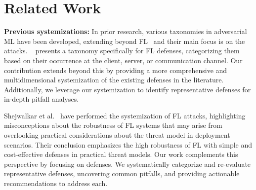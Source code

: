 \section{Related Work}\label{sec:related}
\noindent\textbf{Previous systemizations: }
In prior research, various taxonomies
in adversarial ML have been developed, extending beyond
FL~\cite{goldblum2020dataset, jere2020taxonomy, barreno2010the, biggio2018wild, huang2011adversarial, rodriguez2023survey} and their main focus is on the attacks.
~\cite{rodriguez2023survey}  presents a taxonomy specifically for FL defenses, categorizing them based on their occurrence at the client, server, or communication channel. Our contribution extends beyond this by providing a more comprehensive and multidimensional systemization of the existing defenses in the literature. Additionally, we leverage our systemization to identify representative defenses for in-depth pitfall analyses.


Shejwalkar et al.~\cite{shejwalkar2022back} have performed the systemization of FL attacks, highlighting misconceptions about the robustness of FL systems that may arise from overlooking practical considerations about the threat model in deployment scenarios. Their conclusion emphasizes the high robustness of FL with simple and cost-effective defenses in practical threat models. Our work complements this perspective by focusing on defenses. We systematically categorize and re-evaluate representative defenses, uncovering common pitfalls, and providing actionable recommendations to address each.

